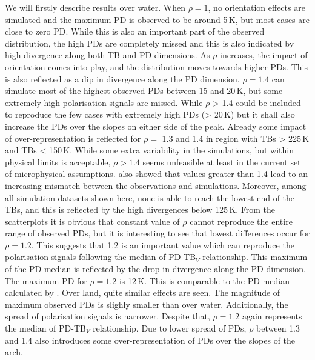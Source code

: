 \documentclass[amt, manuscript]{copernicus}
\begin{document}
We will firstly describe results over water. When $\rho = 1$, no orientation effects are simulated and the maximum PD is observed to be around 5\,K, but most cases are close to zero PD. While this is also an important part of the observed distribution, the high PDs are completely missed and this is also indicated by high divergence along both TB and PD dimensions. As $\rho$ increases, the impact of orientation comes into play, and the distribution moves towards higher PDs. This is also reflected as a dip in divergence along the PD dimension. $\rho = 1.4$ can simulate most of the highest observed PDs between 15 and 20\,K, but some extremely high polarisation signals are missed. While $\rho$ > 1.4  could be included to reproduce the few cases with extremely high PDs (> 20\,K) but it shall also increase the PDs over the slopes on either side of the peak. Already some impact of over-representation is reflected for $\rho =$ 1.3 and 1.4 in region with TBs > 225\,K and TBs < 150\,K. While some extra variability in the simulations, but within physical limits is acceptable, $\rho > 1.4$ seems unfeasible at least in the current set of microphysical assumptions. \citet{barlakas:intro:21} also showed that values greater than 1.4 lead to an increasing mismatch between the observations and simulations.  Moreover, among all simulation datasets shown here, none is able to reach the lowest end of the TBs, and this is reflected by the high divergences below 125\,K. From the scatterplots it is obvious that constant value of $\rho$ cannot reproduce the entire range of observed PDs, but it is  interesting to see that lowest differences occur for  $\rho = 1.2$. This suggests that 1.2 is an important value which can reproduce the polarisation signals following the median of PD-TB$_V$ relationship. This maximum of the PD median is reflected by the drop in divergence along the PD dimension. The maximum PD for $\rho = 1.2$ is 12\,K. This is comparable to the PD median calculated by \citet{galligani:param:21}. Over land, quite similar effects are seen. The magnitude of maximum observed PDs is slighly smaller than over water. Additionally, the spread of polarisation signals is narrower. Despite that, $\rho = 1.2$ again represents the median of PD-TB$_{V}$ relationship. Due to lower spread of PDs, $\rho$ between 1.3 and 1.4 also introduces some over-representation of PDs over the slopes of the arch. 
\end{document}
